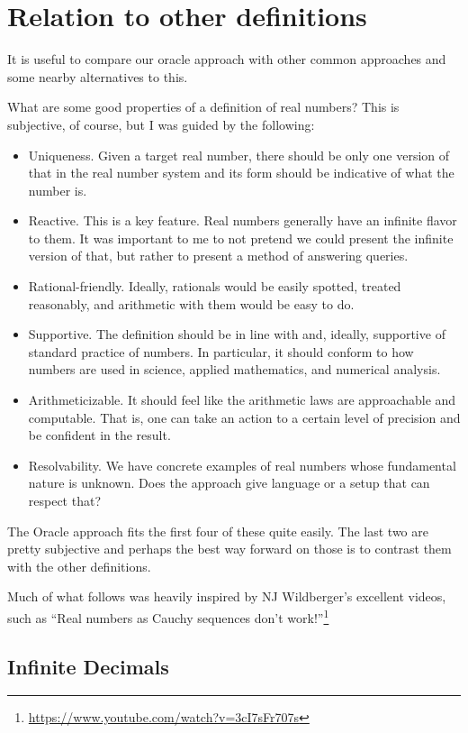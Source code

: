 \documentclass[12pt]{article}
\theoremstyle{remark}
\begin{document}
\section{Relation to other definitions}\label{sec:others}

It is useful to compare our oracle approach with other common approaches and some nearby alternatives to this. 

What are some good properties of a definition of real numbers? This is subjective, of course, but I was guided by the following: 

\begin{itemize}
    \item Uniqueness. Given a target real number, there should be only one version of that in the real number system and its form should be indicative of what the number is. 
    \item Reactive. This is a key feature. Real numbers generally have an infinite flavor to them. It was important to me to not pretend we could present the infinite version of that, but rather to present a method of answering queries. 
    \item Rational-friendly. Ideally, rationals would be easily spotted, treated reasonably, and arithmetic with them would be easy to do. 
    \item Supportive. The definition should be in line with and, ideally, supportive of standard practice of numbers. In particular, it should conform to how numbers are used in science, applied mathematics, and numerical analysis. 
    \item Arithmeticizable. It should feel like the arithmetic laws are approachable and computable. That is, one can take an action to a certain level of precision and be confident in the result.
    \item Resolvability. We have concrete examples of real numbers whose fundamental nature is unknown. Does the approach give language or a setup that can respect that? 
\end{itemize}

The Oracle approach fits the first four of these quite easily. The last two are pretty subjective and perhaps the best way forward on those is to contrast them with the other definitions. 

Much of what follows was heavily inspired by NJ Wildberger's excellent videos, such as ``Real numbers as Cauchy sequences don't work!''\footnote{\url{https://www.youtube.com/watch?v=3cI7sFr707s}}


\subsection{Infinite Decimals}
\end{document}
